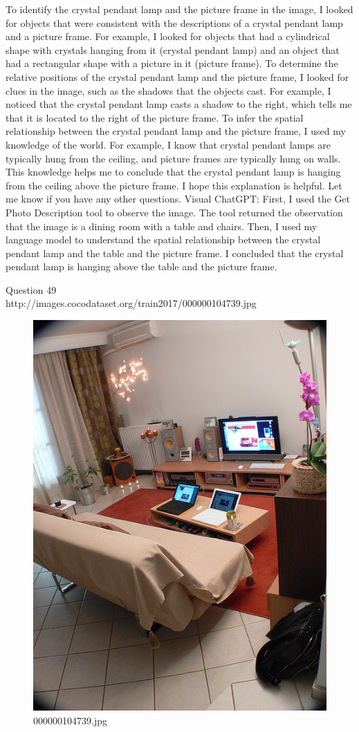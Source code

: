 \begin{enumerate}
    To identify the crystal pendant lamp and the picture frame in the image, I looked for objects that were consistent with the descriptions of a crystal pendant lamp and a picture frame. For example, I looked for objects that had a cylindrical shape with crystals hanging from it (crystal pendant lamp) and an object that had a rectangular shape with a picture in it (picture frame).
    To determine the relative positions of the crystal pendant lamp and the picture frame, I looked for clues in the image, such as the shadows that the objects cast. For example, I noticed that the crystal pendant lamp casts a shadow to the right, which tells me that it is located to the right of the picture frame.
    To infer the spatial relationship between the crystal pendant lamp and the picture frame, I used my knowledge of the world. For example, I know that crystal pendant lamps are typically hung from the ceiling, and picture frames are typically hung on walls. This knowledge helps me to conclude that the crystal pendant lamp is hanging from the ceiling above the picture frame.
    I hope this explanation is helpful. Let me know if you have any other questions.
    \subitem Visual ChatGPT: First, I used the Get Photo Description tool to observe the image. The tool returned the observation that the image is a dining room with a table and chairs. Then, I used my language model to understand the spatial relationship between the crystal pendant lamp and the table and the picture frame. I concluded that the crystal pendant lamp is hanging above the table and the picture frame.
\end{enumerate}
Question 49\\
http://images.cocodataset.org/train2017/000000104739.jpg
\begin{figure}[h]
    \centering
    \includegraphics[width=0.8\linewidth]{../image set/hard/000000104739.jpg}
    \caption{000000104739.jpg}
\end{figure}
